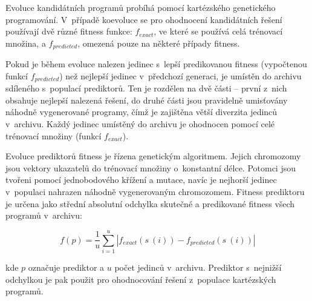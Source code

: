 Evoluce kandidátních programů probíhá pomocí kartézského genetického programování. V~případě koevoluce se pro ohodnocení kandidátních řešení používají dvě různé fitness funkce: $f_{\mathit{exact}}$, ve které se používá celá trénovací množina, a $f_{\mathit{predicted}}$, omezená pouze na některé případy fitness.




Pokud je během evoluce nalezen jedinec s~lepší predikovanou fitness (vypočtenou funkcí $f_{\mathit{predicted}}$) než nejlepší jedinec v~předchozí generaci, je umístěn do archivu sdíleného s~populací prediktorů. Ten je rozdělen na dvě části -- první z~nich obsahuje nejlepší nalezená řešení, do druhé části jsou pravidelně umisťovány náhodně vygenerované programy, čímž je zajištěna větší diverzita jedinců v~archivu. Každý jedinec umístěný do archivu je ohodnocen pomocí celé trénovací množiny (funkcí $f_{\mathit{exact}}$).

Evoluce prediktorů fitness je řízena genetickým algoritmem. Jejich chromozomy jsou vektory ukazatelů do trénovací množiny o~konstantní délce. Potomci jsou tvořeni pomocí jednobodového křížení a mutace, navíc je nejhorší jedinec v~populaci nahrazen náhodně vygenerovaným chromozomem. Fitness prediktoru je určena jako střední absolutní odchylka skutečné a predikované fitness všech programů v~archivu:

\begin{equation}
    \label{eqFpredictorSR}
    f \left( p \right) = \frac{1}{u} \sum\limits_{i=1}^{u} \left| f_{\mathit{exact}} \left( s~\left( i \right) \right) - f_{\mathit{predicted}} \left( s~\left( i \right) \right) \right|
\end{equation}

\noindent{}kde $p$ označuje prediktor a $u$ počet jedinců v~archivu. Prediktor s~nejnižší odchylkou je pak použit pro ohodnocování řešení z~populace kartézských programů.

